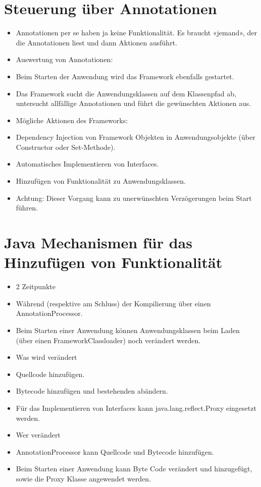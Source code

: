 \section*{Steuerung über Annotationen}
\begin{itemize}
  \item Annotationen per se haben ja keine Funktionalität. Es braucht «jemand», der die Annotationen liest und dann Aktionen ausführt.
  \item Auswertung von Annotationen:
  \item Beim Starten der Anwendung wird das Framework ebenfalls gestartet.
  \item Das Framework sucht die Anwendungsklassen auf dem Klassenpfad ab, untersucht allfällige Annotationen und führt die gewünschten Aktionen aus.
  \item Mögliche Aktionen des Frameworks:
  \item Dependency Injection von Framework Objekten in Anwendungsobjekte (über Constructor oder Set-Methode).
  \item Automatisches Implementieren von Interfaces.
  \item Hinzufügen von Funktionalität zu Anwendungsklassen.
  \item Achtung: Dieser Vorgang kann zu unerwünschten Verzögerungen beim Start führen.
\end{itemize}

\section*{Java Mechanismen für das Hinzufügen von Funktionalität}
\begin{itemize}
  \item 2 Zeitpunkte
  \item Während (respektive am Schluss) der Kompilierung über einen AnnotationProcessor.
  \item Beim Starten einer Anwendung können Anwendungsklassen beim Laden (über einen FrameworkClassloader) noch verändert werden.
  \item Was wird verändert
  \item Quellcode hinzufügen.
  \item Bytecode hinzufügen und bestehenden abändern.
  \item Für das Implementieren von Interfaces kann java.lang.reflect.Proxy eingesetzt werden.
  \item Wer verändert
  \item AnnotationProcessor kann Quellcode und Bytecode hinzufügen.
  \item Beim Starten einer Anwendung kann Byte Code verändert und hinzugefügt, sowie die Proxy Klasse angewendet werden.
\end{itemize}

